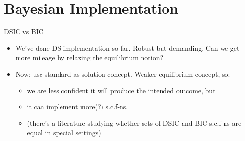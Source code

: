 \documentclass[english,10pt
,aspectratio=169
]{beamer}
\begin{document}
\section{Bayesian Implementation}

\begin{frame}{DSIC vs BIC}
\begin{itemize}
	\item We've done DS implementation so far. Robust but demanding. Can we get more mileage by relaxing the equilibrium notion?
	\item Now: use standard  as solution concept. Weaker equilibrium concept, so:
	\begin{itemize}
		\item we are less confident it will produce the intended outcome, but
		\item it can implement more(?) s.c.f-ns. 
		\item (there's a literature studying whether sets of DSIC and BIC s.c.f-ns are equal in special settings)
	\end{itemize}
\end{itemize}
\end{frame}
\end{document}
